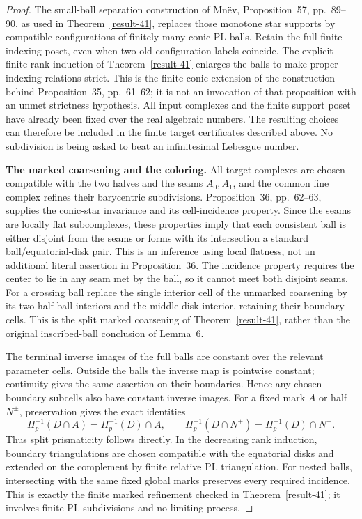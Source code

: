 \documentclass[11pt,a4paper]{article}
\theoremstyle{definition}
\begin{document}
\begin{proof}
The small-ball separation construction of Mn\"ev,
Proposition~57, pp.~89--90, as used in Theorem~\ref{result-41}, replaces those
monotone star supports by compatible configurations of finitely
many conic PL balls. Retain the full finite indexing poset,
even when two old configuration labels coincide. The explicit
finite rank induction of Theorem~\ref{result-41} enlarges the balls to make
proper indexing relations strict. This is the finite conic
extension of the construction behind Proposition~35,
pp.~61--62; it is not an invocation of that proposition with
an unmet strictness hypothesis. All input complexes and the
finite support poset have already been fixed over the real
algebraic numbers. The resulting choices can therefore be
included in the finite target certificates described above.
No subdivision is being asked to beat an infinitesimal
Lebesgue number.

\textbf{The marked coarsening and the coloring.}\quad
All target complexes are chosen compatible with the two
halves and the seams $A_0,A_1$, and the common fine complex
refines their barycentric subdivisions. Proposition~36,
pp.~62--63, supplies the conic-star invariance and its
cell-incidence property. Since the seams are locally flat
subcomplexes, these properties imply that each consistent
ball is either disjoint from the seams or forms with its
intersection a standard ball/equatorial-disk pair. This is
an inference using local flatness, not an additional literal
assertion in Proposition~36. The incidence property requires
the center to lie in any seam met by the ball, so it cannot
meet both disjoint seams.
For a crossing ball replace the single interior cell of the
unmarked coarsening by its two half-ball interiors and the
middle-disk interior, retaining their boundary cells. This
is the split marked coarsening of Theorem~\ref{result-41}, rather than the
original inscribed-ball conclusion of Lemma~6.

The terminal inverse images of the full balls are constant
over the relevant parameter cells. Outside the balls the
inverse map is pointwise constant; continuity gives the same
assertion on their boundaries. Hence any chosen boundary
subcells also have constant inverse images. For a fixed
mark $A$ or half $N^{\pm}$, preservation gives the exact
identities
\begin{equation}
 H_p^{-1}(D\cap A)=H_p^{-1}(D)\cap A,\qquad
 H_p^{-1}(D\cap N^{\pm})=H_p^{-1}(D)\cap N^{\pm}.
 \label{equation-109}
\end{equation}
Thus split prismaticity follows directly. In the decreasing
rank induction, boundary triangulations are chosen compatible
with the equatorial disks and extended on the complement by
finite relative PL triangulation. For nested balls, intersecting
with the same fixed global marks preserves every required
incidence. This is exactly the finite marked refinement checked
in Theorem~\ref{result-41}; it involves finite PL subdivisions and no limiting
process.


\end{proof}
\end{document}

